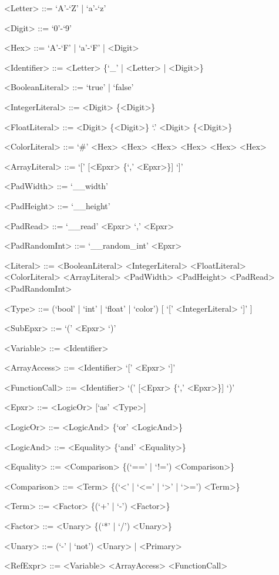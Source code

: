\begin{center}
\begin{grammar}
<Letter> ::= `A'-`Z' | `a'-`z'

<Digit> ::= `0'-`9'

<Hex> ::= `A'-`F' | `a'-`F' | <Digit>

<Identifier> ::= <Letter> \{`\_' | <Letter> | <Digit>\}

<BooleanLiteral> ::= `true' | `false'

<IntegerLiteral> ::= <Digit> \{<Digit>\}

<FloatLiteral> ::= <Digit> \{<Digit>\} `.' <Digit> \{<Digit>\}

<ColorLiteral> ::= `\#' <Hex> <Hex> <Hex> <Hex> <Hex> <Hex>

<ArrayLiteral> ::= `[' [<Epxr> \{`,' <Epxr>\}] `]'

<PadWidth> ::= `\_\_width'

<PadHeight> ::= `\_\_height'

<PadRead> ::= `\_\_read' <Epxr> `,' <Epxr>

<PadRandomInt> ::= `\_\_random\_int' <Epxr>

<Literal> ::= <BooleanLiteral>
\alt <IntegerLiteral>
\alt <FloatLiteral>
\alt <ColorLiteral>
\alt <ArrayLiteral>
\alt <PadWidth>
\alt <PadHeight>
\alt <PadRead>
\alt <PadRandomInt>

<Type> ::= (`bool' | `int' | `float' | `color') [ `[' <IntegerLiteral> `]' ]

<SubEpxr> ::= `(' <Epxr> `)'

<Variable> ::= <Identifier>

<ArrayAccess> ::= <Identifier> `[' <Epxr> `]'

<FunctionCall> ::= <Identifier> `(' [<Epxr> \{`,' <Epxr>\}] `)'

<Epxr> ::= <LogicOr> [`as' <Type>]

<LogicOr> ::= <LogicAnd> \{`or' <LogicAnd>\}

<LogicAnd> ::= <Equality> \{`and' <Equality>\}

<Equality> ::= <Comparison> \{(`==' | `!=') <Comparison>\}

<Comparison> ::= <Term> \{(`<' | `<=' | `>' | `>=') <Term>\}

<Term> ::= <Factor> \{(`+' | `-') <Factor>\}

<Factor> ::= <Unary> \{(`*' | `/') <Unary>\}

<Unary> ::= (`-' | `not') <Unary> | <Primary>

<RefExpr> ::= <Variable>
\alt <ArrayAccess>
\alt <FunctionCall>


\end{grammar}
\end{center}

